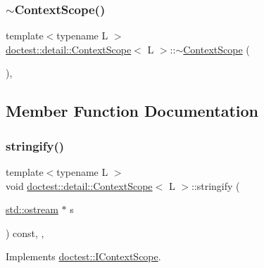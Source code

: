 \subsubsection{\texorpdfstring{$\sim$\+Context\+Scope()}{~ContextScope()}}
{\footnotesize\ttfamily template$<$typename L $>$ \\
\hyperlink{classdoctest_1_1detail_1_1_context_scope}{doctest\+::detail\+::\+Context\+Scope}$<$ L $>$\+::$\sim$\hyperlink{classdoctest_1_1detail_1_1_context_scope}{Context\+Scope} (\begin{DoxyParamCaption}{ }\end{DoxyParamCaption})\hspace{0.3cm}{\ttfamily [inline]}, {\ttfamily [override]}}



\subsection{Member Function Documentation}
\mbox{\label{classdoctest_1_1detail_1_1_context_scope_a4636ac32ae41ae108c7ada4a164ffaeb}} 
\subsubsection{\texorpdfstring{stringify()}{stringify()}}
{\footnotesize\ttfamily template$<$typename L $>$ \\
void \hyperlink{classdoctest_1_1detail_1_1_context_scope}{doctest\+::detail\+::\+Context\+Scope}$<$ L $>$\+::stringify (\begin{DoxyParamCaption}\item[{\hyperlink{doctest_8h_a116af65cb5e924b33ad9d9ecd7a783f3}{std\+::ostream} $\ast$}]{s }\end{DoxyParamCaption}) const\hspace{0.3cm}{\ttfamily [inline]}, {\ttfamily [override]}, {\ttfamily [virtual]}}



Implements \hyperlink{structdoctest_1_1_i_context_scope_affbf0f9bf8107a4a8a805d237288141d}{doctest\+::\+I\+Context\+Scope}.

